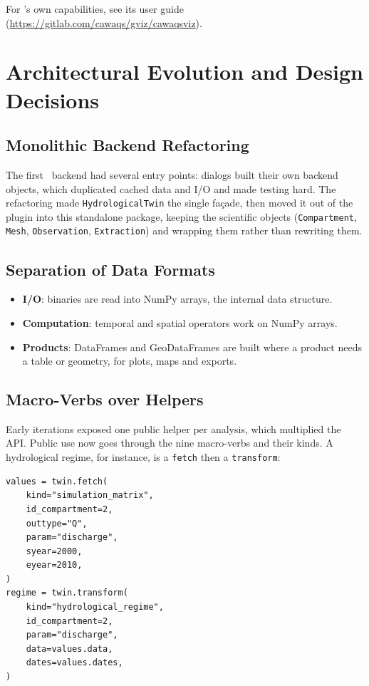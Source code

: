 For \cwv's own capabilities, see its user guide
(\url{https://gitlab.com/cawaqs/gviz/cawaqsviz}).


\section{Architectural Evolution and Design Decisions}

\subsection{Monolithic Backend Refactoring}

The first \cwv\ backend had several entry points: dialogs built their own
backend objects, which duplicated cached data and I/O and made testing hard.
The refactoring made \texttt{HydrologicalTwin} the single façade, then moved
it out of the plugin into this standalone package, keeping the scientific
objects (\texttt{Compartment}, \texttt{Mesh}, \texttt{Observation},
\texttt{Extraction}) and wrapping them rather than rewriting them.

\subsection{Separation of Data Formats}

\begin{itemize}
    \item \textbf{I/O}: binaries are read into NumPy arrays, the internal data structure.
    \item \textbf{Computation}: temporal and spatial operators work on NumPy arrays.
    \item \textbf{Products}: DataFrames and GeoDataFrames are built where a product needs a table or geometry, for plots, maps and exports.
\end{itemize}

\subsection{Macro-Verbs over Helpers}

Early iterations exposed one public helper per analysis, which multiplied the
API. Public use now goes through the nine macro-verbs and their kinds. A
hydrological regime, for instance, is a \texttt{fetch} then a
\texttt{transform}:

\begin{verbatim}
values = twin.fetch(
    kind="simulation_matrix",
    id_compartment=2,
    outtype="Q",
    param="discharge",
    syear=2000,
    eyear=2010,
)
regime = twin.transform(
    kind="hydrological_regime",
    id_compartment=2,
    param="discharge",
    data=values.data,
    dates=values.dates,
)
\end{verbatim}

